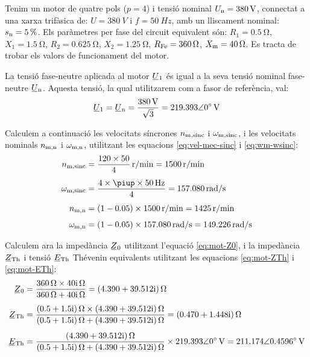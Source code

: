 \begin{exemple}\label{ex:CaractMotor}
	\addcontentsxms{\CaractMotor}	
    Tenim un motor de quatre pols ($p=4$) i tensió nominal $U_\mathrm{n}=\qty{380}{V}$, connectat a una xarxa trifàsica de: $U=\qty{380}{V}$ i $f=\qty{50}{Hz}$, amb un lliscament nominal: $s_\mathrm{n}=\qty{5}{\percent}$. Els paràmetres per fase del circuit equivalent són: $R_1=\qty{0,5}{\ohm}$, $X_1=\qty{1,5}{\ohm}$, $R_2=\qty{0,625}{\ohm}$, $X_2=\qty{1,25}{\ohm}$, $R_\mathrm{Fe}=\qty{360}{\ohm}$, $X_\mathrm{m}=\qty{40}{\ohm}$. Es tracta de trobar els valors de funcionament del motor.

    La tensió fase-neutre aplicada al motor $\cmplx{U}_1$ és igual a la seva tensió nominal  fase-neutre  $\cmplx{U}\ped{n}$. Aquesta tensió, la qual utilitzarem com a fasor de referència, val:
    \[
        \cmplx{U}_1 = \cmplx{U}\ped{n} = \frac{\qty{380}{V}}{\sqrt{3}} = \complexqty{219,393:0}{V}
    \]

    Calculem a continuació les velocitats síncrones $n_\mathrm{m,sinc}$ i $\omega_\mathrm{m,sinc}$, i les velocitats nominals $n_\mathrm{m,n}$ i $\omega_\mathrm{m,n}$, utilitzant les equacions \eqref{eq:vel-mec-sinc} i \eqref{eq:wm-wsinc}:
    \begin{align*}
        n\ped{m,sinc} &= \frac{120\times 50}{4} \, \unit{r/min} = \qty{1500}{r/min} \\[1ex]
        \omega\ped{m,sinc} &= \frac{4 \times\piup \times\qty{50}{Hz}}{4} =  \qty{157,080}{rad/s} \\[1ex]
        n\ped{m,n} &= (1-\num{0,05})\times \qty{1500}{r/min} = \qty{1425}{r/min} \\[1ex]
        \omega\ped{m,n} &= (1-\num{0,05}) \times\qty{157,080}{rad/s} = \qty{149,226}{rad/s}
    \end{align*}

    Calculem ara la impedància $\cmplx{Z}_0$ utilitzant l'equació \eqref{eq:mot-Z0}, i la impedància $\cmplx{Z}\ped{Th}$ i tensió $\cmplx{E}\ped{Th}$ Thévenin equivalents utilitzant les equacions \eqref{eq:mot-ZTh} i \eqref{eq:mot-ETh}:
     \begin{align*}
        \cmplx{Z}_0 &= \frac{\qty{360}{\ohm}\times\complexqty{j40}{\ohm}}{\qty{360}{\ohm}+\complexqty{j40}{\ohm}} = \complexqty{4,390+j39,512}{\ohm} \\[1ex]
        \cmplx{Z}\ped{Th} &= \frac{\complexqty{0,5+j1,5}{\ohm}\times\complexqty{4,390+j39,512}{\ohm}}
        {\complexqty{0,5+j1,5}{\ohm}+\complexqty{4,390+j39,512}{\ohm}} =  \complexqty{0,470+j1,448}{\ohm} \\[1ex]
        \cmplx{E}\ped{Th}  &= \frac{\complexqty{4,390+j39,512}{\ohm}}
        {\complexqty{0,5+j1,5}{\ohm}+\complexqty{4,390+j39,512}{\ohm}}\times\complexqty{219,393:0}{V} =  \complexqty{211,174:0,4596}{V}
    \end{align*}


\end{exemple}
